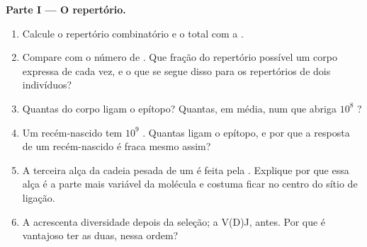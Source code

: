 \begin{problem}
\medskip
\noindent\textbf{Parte I --- O repertório.}
\begin{enumerate}
  \item Calcule o repertório combinatório e o total com a .
  \item Compare com o número de . Que fração do repertório
        possível um corpo expressa de cada vez, e o que se segue disso
        para os repertórios de dois indivíduos?
  \item Quantas  do corpo ligam o epítopo? Quantas, em média,
        num  que abriga $10^{8}$ ?
  \item Um recém-nascido tem $10^{9}$ . Quantas ligam o
        epítopo, e por que a resposta de um recém-nascido é fraca mesmo
        assim?
  \item A terceira alça da cadeia pesada de um  é feita pela
        . Explique por que essa alça é a parte mais
        variável da molécula e costuma ficar no centro do sítio de
        ligação.
  \item A  acrescenta diversidade depois da
        seleção; a V(D)J, antes. Por que é vantajoso ter as duas, nessa
        ordem?
\end{enumerate}


\end{problem}
